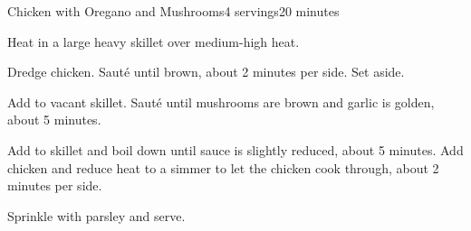 \documentclass[../Cookbook.tex]{subfiles}
\begin{document}
\begin{recipe}{Chicken with Oregano and Mushrooms}{4 servings}{20 minutes}

Heat in a large heavy skillet over medium-high heat.

\Ingredient{\ap}
Dredge chicken. Saut\'e until brown, about 2 minutes per side. Set aside.

Add to vacant skillet. Saut\'e until mushrooms are brown and garlic is golden, about 5 minutes.

Add to skillet and boil down until sauce is slightly reduced, about 5 minutes. Add chicken and reduce heat to a simmer to let the chicken cook through, about 2 minutes per side.

Sprinkle with parsley and serve.

\end{recipe}
\end{document}
